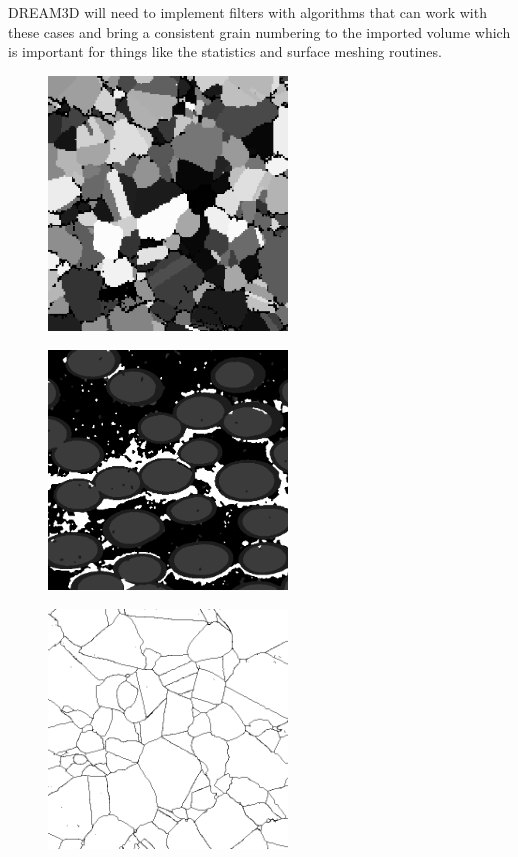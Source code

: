 \documentclass[12pt]{article} %
\begin{document}
DREAM3D will need to implement filters with algorithms that can work with these cases and bring a consistent grain numbering to the imported volume which is important for things like the statistics and surface meshing routines.

\begin{figure}[htbp]
\begin{center}
\includegraphics[width=2.5in]{Type1.png}
\caption{}
\label{figure:Type1}
\end{center}
\end{figure}

\begin{figure}[htbp]
\begin{center}
\includegraphics[width=2.5in]{Type2.png}
\caption{}
\label{figure:Type2}
\end{center}
\end{figure}



\begin{figure}[htbp]
\begin{center}
\includegraphics[width=2.5in]{Type3.png}
\caption{}
\label{figure:Type3}
\end{center}
\end{figure}
\end{document}
